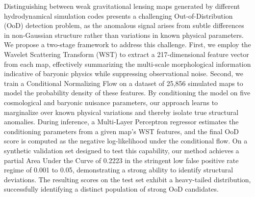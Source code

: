 \documentclass[]{article}
\begin{document}
Distinguishing between weak gravitational lensing maps generated by different hydrodynamical simulation codes presents a challenging Out-of-Distribution (OoD) detection problem, as the anomalous signal arises from subtle differences in non-Gaussian structure rather than variations in known physical parameters. We propose a two-stage framework to address this challenge. First, we employ the Wavelet Scattering Transform (WST) to extract a 217-dimensional feature vector from each map, effectively summarizing the multi-scale morphological information indicative of baryonic physics while suppressing observational noise. Second, we train a Conditional Normalizing Flow on a dataset of 25,856 simulated maps to model the probability density of these features. By conditioning the model on five cosmological and baryonic nuisance parameters, our approach learns to marginalize over known physical variations and thereby isolate true structural anomalies. During inference, a Multi-Layer Perceptron regressor estimates the conditioning parameters from a given map's WST features, and the final OoD score is computed as the negative log-likelihood under the conditional flow. On a synthetic validation set designed to test this capability, our method achieves a partial Area Under the Curve of 0.2223 in the stringent low false positive rate regime of 0.001 to 0.05, demonstrating a strong ability to identify structural deviations. The resulting scores on the test set exhibit a heavy-tailed distribution, successfully identifying a distinct population of strong OoD candidates.
\end{document}
